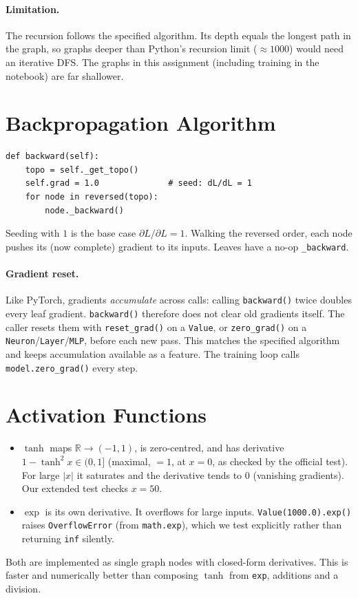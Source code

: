 \documentclass[11pt,a4paper]{article}
\begin{document}
\paragraph{Limitation.} The recursion follows the specified algorithm. Its depth equals the longest path
in the graph, so graphs deeper than Python's recursion limit ($\approx 1000$) would need an iterative DFS.
The graphs in this assignment (including training in the notebook) are far shallower.

\section{Backpropagation Algorithm}
\begin{lstlisting}
def backward(self):
    topo = self._get_topo()
    self.grad = 1.0              # seed: dL/dL = 1
    for node in reversed(topo):
        node._backward()
\end{lstlisting}
Seeding with $1$ is the base case $\partial L/\partial L = 1$. Walking the reversed order, each node pushes
its (now complete) gradient to its inputs. Leaves have a no-op \texttt{\_backward}.

\paragraph{Gradient reset.} Like PyTorch, gradients \emph{accumulate} across calls: calling
\texttt{backward()} twice doubles every leaf gradient. \texttt{backward()} therefore does not clear old
gradients itself. The caller resets them with \texttt{reset\_grad()} on a \texttt{Value}, or
\texttt{zero\_grad()} on a \texttt{Neuron}/\texttt{Layer}/\texttt{MLP}, before each new pass. This matches the
specified algorithm and keeps accumulation available as a feature. The training loop calls
\texttt{model.zero\_grad()} every step.

\section{Activation Functions}
\begin{itemize}
  \item $\tanh$ maps $\mathbb{R}\to(-1,1)$, is zero-centred, and has derivative $1-\tanh^2 x \in (0,1]$
        (maximal, $=1$, at $x=0$, as checked by the official test). For large $|x|$ it saturates and the
        derivative tends to $0$ (vanishing gradients). Our extended test checks $x=50$.
  \item $\exp$ is its own derivative. It overflows for large inputs. \texttt{Value(1000.0).exp()} raises
        \texttt{OverflowError} (from \texttt{math.exp}), which we test explicitly rather than returning \texttt{inf} silently.
\end{itemize}
Both are implemented as single graph nodes with closed-form derivatives. This is faster and numerically
better than composing $\tanh$ from \texttt{exp}, additions and a division.
\end{document}
